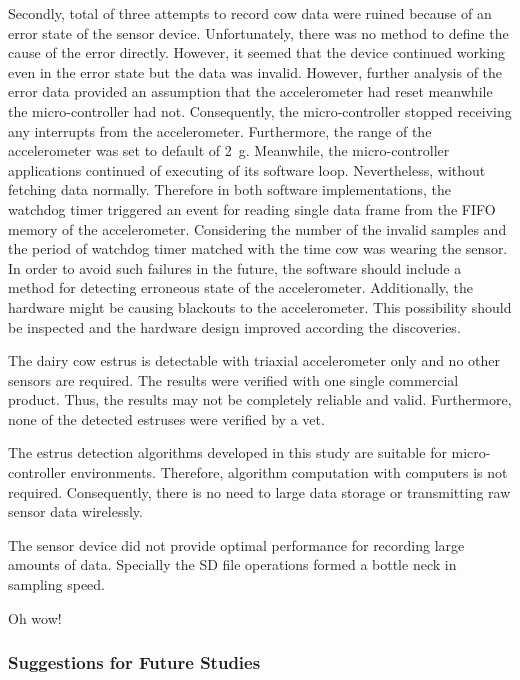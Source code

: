 \documentclass[english,12pt,a4paper,pdftex,elec,utf8]{aaltothesis}
\begin{document}
Secondly, total of three attempts to record cow data were ruined because of an error state of the sensor device. Unfortunately, there was no method to define the cause of the error directly. However, it seemed that the device continued working even in the error state but the data was invalid. However, further analysis of the error data provided an assumption that the accelerometer had reset meanwhile the micro-controller had not. Consequently, the micro-controller stopped receiving any interrupts from the accelerometer. Furthermore, the range of the accelerometer was set to default of \SI{2}{\gram}. Meanwhile, the micro-controller applications continued of executing of its software loop. Nevertheless, without fetching data normally. Therefore in both software implementations, the watchdog timer triggered an event for reading single data frame from the FIFO memory of the accelerometer. Considering the number of the invalid samples and the period of watchdog timer matched with the time cow was wearing the sensor. In order to avoid such failures in the future, the software should include a method for detecting erroneous state of the accelerometer. Additionally, the hardware might be causing blackouts to the accelerometer. This possibility should be inspected and the hardware design improved according the discoveries.





The dairy cow estrus is detectable with triaxial accelerometer only and no other sensors are required. The results were verified with one single commercial product. Thus, the results may not be completely reliable and valid. Furthermore, none of the detected estruses were verified by a vet.

The estrus detection algorithms developed in this study are suitable for micro-controller environments. Therefore, algorithm computation with computers is not required. Consequently, there is no need to large data storage or transmitting raw sensor data wirelessly.

The sensor device did not provide optimal performance for recording large amounts of data. Specially the SD file operations formed a bottle neck in sampling speed.


Oh wow!

\subsubsection{Suggestions for Future Studies}
\end{document}
